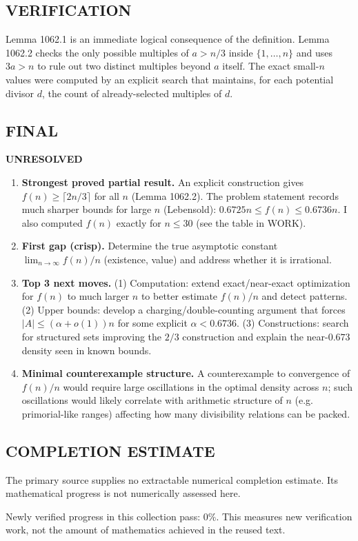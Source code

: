 \subsection*{VERIFICATION}
Lemma 1062.1 is an immediate logical consequence of the definition.
Lemma 1062.2 checks the only possible multiples of $a>n/3$ inside $\{1,\dots,n\}$ and uses $3a>n$ to rule out two distinct multiples beyond $a$ itself.
The exact small-$n$ values were computed by an explicit search that maintains, for each potential divisor $d$, the count of already-selected multiples of $d$.

\subsection*{FINAL}
\textbf{UNRESOLVED}
\begin{enumerate}
\item[(i)] \textbf{Strongest proved partial result.}
An explicit construction gives $f(n)\ge \lceil 2n/3\rceil$ for all $n$ (Lemma 1062.2). The problem statement records much sharper bounds for large $n$ (Lebensold): $0.6725n\le f(n)\le 0.6736n$. I also computed $f(n)$ exactly for $n\le 30$ (see the table in WORK).
\item[(ii)] \textbf{First gap (crisp).}
Determine the true asymptotic constant $\lim_{n\to\infty} f(n)/n$ (existence, value) and address whether it is irrational.
\item[(iii)] \textbf{Top 3 next moves.}
(1) Computation: extend exact/near-exact optimization for $f(n)$ to much larger $n$ to better estimate $f(n)/n$ and detect patterns.
(2) Upper bounds: develop a charging/double-counting argument that forces $|A|\le (\alpha+o(1))n$ for some explicit $\alpha<0.6736$.
(3) Constructions: search for structured sets improving the $2/3$ construction and explain the near-$0.673$ density seen in known bounds.
\item[(iv)] \textbf{Minimal counterexample structure.}
A counterexample to convergence of $f(n)/n$ would require large oscillations in the optimal density across $n$; such oscillations would likely correlate with arithmetic structure of $n$ (e.g. primorial-like ranges) affecting how many divisibility relations can be packed.
\end{enumerate}




\subsection*{COMPLETION ESTIMATE}
The primary source supplies no extractable numerical completion estimate. Its mathematical progress is not numerically assessed here.

Newly verified progress in this collection pass: $0\%$. This measures new verification work, not the amount of mathematics achieved in the reused text.
